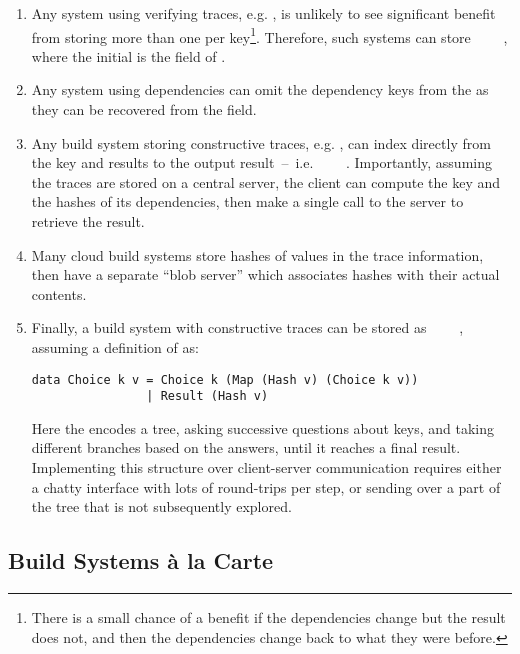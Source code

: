 \begin{enumerate}
\item Any system using verifying traces, e.g. \Shake, is unlikely to see significant benefit from storing more than one  per key\footnote{There is a small chance of a benefit if the dependencies change but the result does not, and then the dependencies change back to what they were before.}. Therefore, such systems can store ~~~~, where the initial  is the  field of .
\item Any system using  dependencies can omit the dependency keys from the  as they can be recovered from the  field.
\item Any  build system storing constructive traces, e.g. \Bazel, can index directly from the key and results to the output result~--~i.e. ~~\hs{[Hash}~\hs{v])}~. Importantly, assuming the traces are stored on a central server, the client can compute the key and the hashes of its dependencies, then make a single call to the server to retrieve the result.
\item Many cloud build systems store hashes of values in the trace information, then have a separate ``blob server'' which associates hashes with their actual contents.
\item Finally, a  build system with constructive traces can be stored as ~~~~, assuming a definition of  as:
\begin{verbatim}
data Choice k v = Choice k (Map (Hash v) (Choice k v))
                | Result (Hash v)
\end{verbatim}
Here the  encodes a tree, asking successive questions about keys, and taking different branches based on the answers, until it reaches a final result. Implementing this structure over client-server communication requires either a chatty interface with lots of round-trips per  step, or sending over a part of the tree that is not subsequently explored.
\end{enumerate}

\subsection{Build Systems \`a la Carte}\label{sec-design-space}

